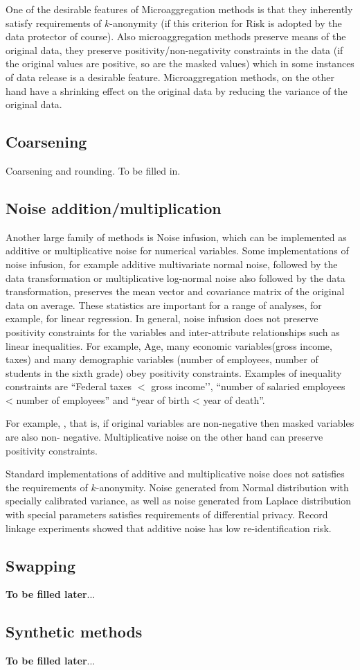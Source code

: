 One of the desirable features of Microaggregation methods is that they  inherently satisfy requirements of $k$-anonymity (if this criterion for Risk  is adopted by the data protector of course). Also microaggregation methods preserve means of the original data, they preserve positivity/non-negativity  constraints in the data (if the original values are positive, so are the masked values)  which in some instances of data release  is a desirable feature. Microaggregation methods, on the other hand have a shrinking effect on the original data by reducing  the variance of the original data.

\subsection{Coarsening}
Coarsening and rounding. To be filled in.
 
\subsection{Noise addition/multiplication} 

Another large family of methods is Noise infusion, which can be implemented as additive or multiplicative noise for numerical variables.
Some implementations of noise infusion, for example additive multivariate normal noise, followed by the data transformation \cite{} or multiplicative log-normal noise \cite{} also followed by the data transformation, preserves the mean vector and covariance matrix of the original data on average. These statistics are important for a range of analyses, for example, for linear regression. In general, noise infusion does not preserve positivity constraints for the variables and inter-attribute relationships such as linear inequalities. For example, Age, many
economic variables(gross income, taxes) and many demographic variables (number of employees, number of students in the sixth grade) obey positivity constraints. Examples of inequality constraints are ``Federal taxes $<$ gross income’’, ``number of salaried employees < number of employees'' and ``year of birth < year of death''.



For example, , that is, if original variables are non-negative then masked variables are also non- negative. Multiplicative noise on the other hand can preserve positivity constraints.
 
Standard implementations of additive and multiplicative noise does not satisfies the requirements of $k$-anonymity.
Noise generated from Normal distribution with specially calibrated variance, as well as noise generated from Laplace distribution with special parameters  satisfies requirements of  differential privacy.
Record linkage experiments showed that additive noise has low re-identification risk.

\subsection{Swapping}
{\bf To be filled later}...


\subsection{Synthetic methods}
{\bf To be filled later}...